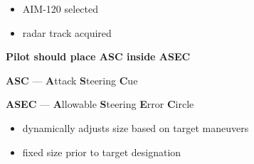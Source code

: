 \begin{tcoloritemize}
{\begin{subitemize}
        \begin{itemize}
            \item AIM-120 selected
            \item radar track acquired
        \end{itemize}
        \item \textbf{Pilot should place ASC inside ASEC}
        \item \textbf{ASC} --- \textbf{A}ttack \textbf{S}teering \textbf{C}ue
        \item \textbf{ASEC} --- \textbf{A}llowable \textbf{S}teering \textbf{E}rror \textbf{C}ircle
        \begin{itemize}
            \item dynamically adjusts size based on target maneuvers
            \item fixed size prior to target designation
        \end{itemize}
    \end{subitemize}}
\end{tcoloritemize}

\clearpage

